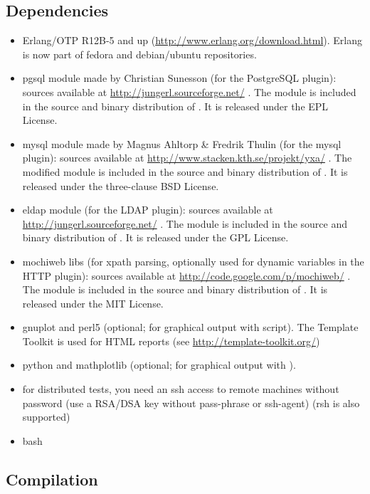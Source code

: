 \documentclass{TSUNG-en}
\begin{document}
\subsection{Dependencies}
\begin{itemize}
\item Erlang/OTP R12B-5 and up
  (\url{http://www.erlang.org/download.html}). Erlang is now
  part of fedora and debian/ubuntu repositories.
  \item pgsql module made by Christian Sunesson (for the PostgreSQL plugin):
    sources available at
    \url{http://jungerl.sourceforge.net/} . The module is
    included in the source and binary distribution of . It
    is released under the EPL License.
  \item mysql module made by Magnus Ahltorp \& Fredrik Thulin  (for the mysql plugin):
    sources available at
    \url{http://www.stacken.kth.se/projekt/yxa/} . The modified module is
    included in the source and binary distribution of . It
    is released under the three-clause BSD License.
  \item eldap module  (for the LDAP plugin):
    sources available at
    \url{http://jungerl.sourceforge.net/} . The module is
    included in the source and binary distribution of . It
    is released under the GPL License.
  \item mochiweb libs (for xpath parsing, optionally used for dynamic variables in
    the HTTP plugin):
    sources available at
    \url{http://code.google.com/p/mochiweb/} . The module is
    included in the source and binary distribution of . It
    is released under the MIT License.
   \item  gnuplot and perl5 (optional; for graphical output with
     script).  The Template Toolkit is used for HTML
    reports (see \url{http://template-toolkit.org/})
   \item  python and mathplotlib (optional; for graphical output with
    ).
  \item for distributed tests, you need an ssh access to remote
    machines without password (use a RSA/DSA key without pass-phrase or
    ssh-agent) (rsh is also supported)
\item bash
\end{itemize}
\subsection{Compilation}
\end{document}
